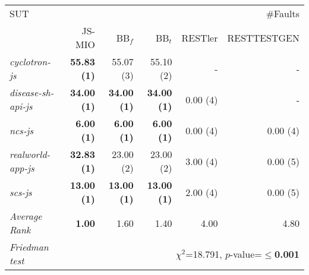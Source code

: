 \begin{tabular}{ l r r r r r}\\ 
\toprule 
SUT & \multicolumn{5}{r}{\#Faults}\\ 
 & JS-MIO & BB$_f$ & BB$_t$ & RESTler & RESTTESTGEN \\ 
\midrule 
\emph{cyclotron-js} &\textbf{55.83 (1)} &55.07 (3) &55.10 (2) &- &- \\ 
\emph{disease-sh-api-js} &\textbf{34.00 (1)} &\textbf{34.00 (1)} &\textbf{34.00 (1)} &0.00 (4) &- \\ 
\emph{ncs-js} &\textbf{6.00 (1)} &\textbf{6.00 (1)} &\textbf{6.00 (1)} &0.00 (4) &0.00 (4) \\ 
\emph{realworld-app-js} &\textbf{32.83 (1)} &23.00 (2) &23.00 (2) &3.00 (4) &0.00 (5) \\ 
\emph{scs-js} &\textbf{13.00 (1)} &\textbf{13.00 (1)} &\textbf{13.00 (1)} &2.00 (4) &0.00 (5) \\ 
\midrule 
\emph{Average Rank} & \textbf{1.00} & 1.60 & 1.40 & 4.00 & 4.80 \\ 
\midrule 
\emph{Friedman test} & \multicolumn{5}{r}{${\chi}^2$=18.791, $p$-value=\textbf{$\le $0.001}} \\ 
\bottomrule 
\end{tabular} 
